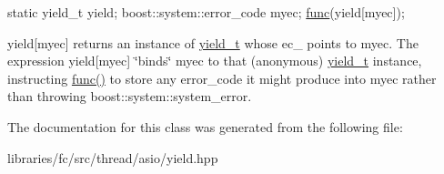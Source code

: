 \begin{DoxyCode}
\textcolor{keyword}{static} yield\_t yield;
boost::system::error\_code myec;
\mbox{\hyperlink{structfunc}{func}}(yield[myec]);
\end{DoxyCode}
 {\ttfamily yield}\mbox{[}myec\mbox{]} returns an instance of {\ttfamily \mbox{\hyperlink{classboost_1_1fibers_1_1asio_1_1yield__t}{yield\+\_\+t}}} whose {\ttfamily ec\+\_\+} points to {\ttfamily myec}. The expression {\ttfamily yield}\mbox{[}myec\mbox{]} \char`\"{}binds\char`\"{} {\ttfamily myec} to that (anonymous) {\ttfamily \mbox{\hyperlink{classboost_1_1fibers_1_1asio_1_1yield__t}{yield\+\_\+t}}} instance, instructing {\ttfamily \mbox{\hyperlink{structfunc}{func()}}} to store any {\ttfamily error\+\_\+code} it might produce into {\ttfamily myec} rather than throwing {\ttfamily boost\+::system\+::system\+\_\+error}. 

The documentation for this class was generated from the following file\+:\begin{DoxyCompactItemize}
\item 
libraries/fc/src/thread/asio/yield.\+hpp\end{DoxyCompactItemize}
